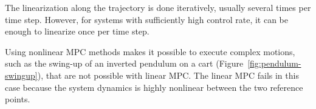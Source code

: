 The linearization along the trajectory is done iteratively, usually several
times per time step. However, for systems with sufficiently high control rate,
it can be enough to linearize once per time step.~\cite{Diehl.ea:2005:Real}

Using nonlinear MPC methods makes it possible to execute complex motions, such
as the swing-up of an inverted pendulum on a cart
(Figure~\ref{fig:pendulum-swingup}), that are not possible with linear MPC.
The linear MPC fails in this case because the system dynamics is highly
nonlinear between the two reference points.

\begin{figure*}
\setlength{}%
  \setlength\figureheight{0.618\figurewidth}%
  \footnotesize%
  \caption[Comparison between the control behavior of linear MPC and
  nonlinear MPC.]{Comparison between the control behavior of linear MPC (left)
and nonlinear MPC based on SQP (right) for a swing-up of an inverted pendulum
on a cart. The reference angle jumps from $\pi$ to $0$ at $t=0.5\unit{s}$. The
linear MPC is linearized about the target position. Everything else as in
Figure~\ref{fig:lookahead-comparison}.}
  \label{fig:pendulum-swingup}
\end{figure*}
